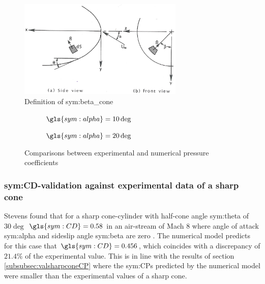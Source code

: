 \begin{figure}[ht]
	\centering
	\includegraphics[width=0.7\textwidth]{./Figure/Aerodynamics/def_beta}
	\caption[Definition of \gls{sym:beta_cone}]{Definition of \gls{sym:beta_cone} \cite{Bertin1994}}
	\label{fig:beta_cone}
\end{figure}

\begin{figure}[ht]
	\centering
	\begin{subfigure}[b]{0.49\textwidth}
		\centering
		\setlength{} 
		\setlength{}
		
		\caption{$\gls{sym:alpha}=10\deg$}
		\label{fig:CPconealpha10}
	\end{subfigure}
		\begin{subfigure}[b]{0.49\textwidth}
			\centering
			\setlength{} 
			\setlength{}
			
		\caption{$\gls{sym:alpha}=20\deg$}
		\label{fig:CPconealpha20}
	\end{subfigure}
	\caption{Comparisons between experimental and numerical pressure coefficients}
	\label{fig:CPcone30val}
\end{figure}

\subsubsection{\acrshort{sym:CD}-validation against experimental data of a sharp cone}
\label{subsubsec:valsharpconeCD}
Stevens found that for a sharp cone-cylinder with half-cone angle \gls{sym:theta} of $30\deg$ $\gls{sym:CD}=0.58$ in an air-stream of Mach $8$ where angle of attack \gls{sym:alpha} and sideslip angle \gls{sym:beta} are zero \cite{Stevens1950,AndersonJr.2007}. The numerical model predicts for this case that $\gls{sym:CD}=0.456$, which coincides with a discrepancy of $21.4\%$ of the experimental value. This is in line with the results of section \ref{subsubsec:valsharpconeCP} where the \glspl{sym:CP} predicted by the numerical model were smaller than the experimental values of a sharp cone.


